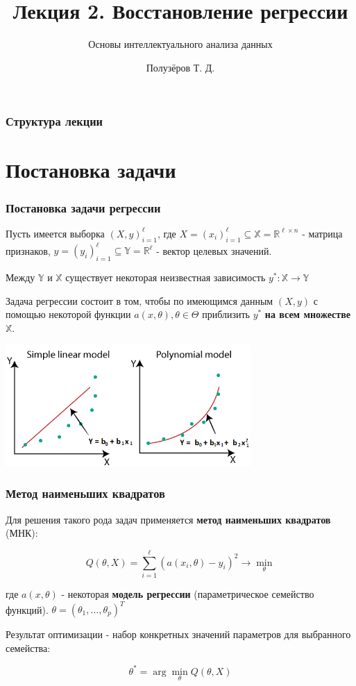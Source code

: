 \documentclass{beamer}
\title[Восстановление регрессии]{Лекция 2. Восстановление регрессии}
\subtitle{Основы интеллектуального анализа данных}
\author{Полузёров Т. Д.}
\institute{БГУ ФПМИ}
\date{}
\begin{document}
	
	\begin{frame}
		\titlepage
	\end{frame}
	
	
	\begin{center}
		\frametitle{Структура лекции}
		\tableofcontents	
	\end{center}
	
	
	\section{Постановка задачи}
	
	
	\begin{frame}
		\frametitle{Постановка задачи регрессии}
		Пусть имеется выборка $(X, y)_{i=1}^{\ell}$, где $X = (x_i)_{i=1}^{\ell} \subseteq \mathbb{X} = \mathbb{R}^{\ell \times n}$ - матрица признаков, $y = (y_i)_{i=1}^{\ell}\subseteq \mathbb{Y} = \mathbb{R}^{\ell}$ - вектор целевых значений.
		
		Между $\mathbb{Y}$ и $\mathbb{X}$ существует некоторая неизвестная зависимость $y^{*}: \mathbb{X} \to \mathbb{Y}$
		
		\vspace{5pt}
		
		Задача регрессии состоит в том, чтобы по имеющимся данным $(X, y)$ с помощью некоторой функции $a(x, \theta), \theta \in \Theta$ приблизить $y^{*}$ \textbf{на всем множестве} $\mathbb{X}$.
		
		\centering
		\includegraphics[width=0.7\textwidth]{img/regr_ex.png}
	\end{frame}
	
	
	\begin{frame}
		\frametitle{Метод наименьших квадратов}
		Для решения такого рода задач применяется \textbf{метод наименьших квадратов} (МНК):
		
		$$
		Q(\theta, X) = \sum_{i=1}^{\ell} (a(x_i, \theta) - y_i)^{2} \to \min_{\theta}
		$$
		
		где $a(x, \theta)$ - некоторая \textbf{модель регрессии} (параметрическое семейство функций). $\theta = (\theta_1, ..., \theta_p)^{T}$
		
		\vspace{15pt}
		
		Результат оптимизации - набор конкретных значений параметров для выбранного семейства: 
		
		$$
		\theta^{*} = \arg \min_{\theta} Q(\theta, X)
		$$		
	\end{frame}
\end{document}
